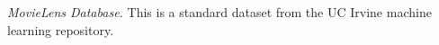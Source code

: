 \documentclass{article}
\begin{document}

{\em MovieLens Database.} This is a standard dataset from the UC Irvine machine learning repository. 
%
\end{document}
